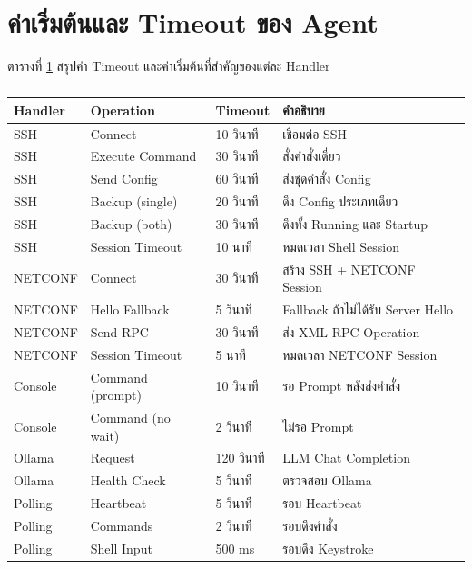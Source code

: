 \section{ค่าเริ่มต้นและ Timeout ของ Agent}
\hspace*{1.3em}
ตารางที่ \ref{tabD2:AgentTimeouts} สรุปค่า Timeout และค่าเริ่มต้นที่สำคัญของแต่ละ Handler

\begin{table}[H]
\centering
\caption{}
\label{tabD2:AgentTimeouts}
\fontSixTeen
\begin{tabularx}{\textwidth}{|l|l|l|X|}
\hline
\textbf{Handler} & \textbf{Operation} & \textbf{Timeout} & \textbf{คำอธิบาย} \\
\hline
SSH & Connect & 10 วินาที & เชื่อมต่อ SSH \\
\hline
SSH & Execute Command & 30 วินาที & สั่งคำสั่งเดี่ยว \\
\hline
SSH & Send Config & 60 วินาที & ส่งชุดคำสั่ง Config \\
\hline
SSH & Backup (single) & 20 วินาที & ดึง Config ประเภทเดียว \\
\hline
SSH & Backup (both) & 30 วินาที & ดึงทั้ง Running และ Startup \\
\hline
SSH & Session Timeout & 10 นาที & หมดเวลา Shell Session \\
\hline
NETCONF & Connect & 30 วินาที & สร้าง SSH + NETCONF Session \\
\hline
NETCONF & Hello Fallback & 5 วินาที & Fallback ถ้าไม่ได้รับ Server Hello \\
\hline
NETCONF & Send RPC & 30 วินาที & ส่ง XML RPC Operation \\
\hline
NETCONF & Session Timeout & 5 นาที & หมดเวลา NETCONF Session \\
\hline
Console & Command (prompt) & 10 วินาที & รอ Prompt หลังส่งคำสั่ง \\
\hline
Console & Command (no wait) & 2 วินาที & ไม่รอ Prompt \\
\hline
Ollama & Request & 120 วินาที & LLM Chat Completion \\
\hline
Ollama & Health Check & 5 วินาที & ตรวจสอบ Ollama \\
\hline
Polling & Heartbeat & 5 วินาที & รอบ Heartbeat \\
\hline
Polling & Commands & 2 วินาที & รอบดึงคำสั่ง \\
\hline
Polling & Shell Input & 500 ms & รอบดึง Keystroke \\
\hline
\end{tabularx}
\end{table}


